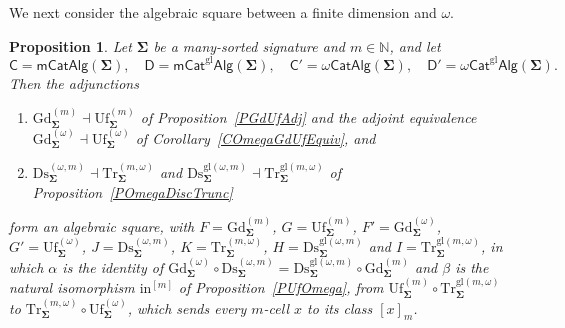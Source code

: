 \documentclass[a4paper, reqno
]{amsart}
\newcommand{\sig}[1]{\mathbf{#1}}             %
\newcommand{\gl}{\mathrm{gl}}                %
\newcommand{\Gd}{\mathrm{Gd}}
\newcommand{\Uf}{\mathrm{Uf}}
\newcommand{\Ds}{\mathrm{Ds}}
\newcommand{\Tr}{\mathrm{Tr}}
\theoremstyle{plain}
\newtheorem{proposition}[theorem]{Proposition}
\theoremstyle{definition}
\begin{document}
We next consider the algebraic square between a finite dimension and $\omega$.

\begin{proposition}\label{PAlgSquareOmega}
Let $\sig{\Sigma}$ be a many-sorted signature and $m\in\mathbb{N}$, and let
$$
\mathsf{C}=\mathsf{mCatAlg}(\sig{\Sigma}),\quad
\mathsf{D}=\mathsf{mCat}^{\gl}\mathsf{Alg}(\sig{\Sigma}),\quad
\mathsf{C}'=\omega\mathsf{CatAlg}(\sig{\Sigma}),\quad
\mathsf{D}'=\omega\mathsf{Cat}^{\gl}\mathsf{Alg}(\sig{\Sigma}).
$$
Then the adjunctions
\begin{enumerate}
\item $\Gd^{(m)}_{\sig{\Sigma}}\dashv\Uf^{(m)}_{\sig{\Sigma}}$ of Proposition~\ref{PGdUfAdj} and the adjoint equivalence $\Gd^{(\omega)}_{\sig{\Sigma}}\dashv\Uf^{(\omega)}_{\sig{\Sigma}}$ of Corollary~\ref{COmegaGdUfEquiv}, and
\item $\Ds^{(\omega,m)}_{\sig{\Sigma}}\dashv \Tr^{(m,\omega)}_{\sig{\Sigma}}$ and $\Ds^{\gl(\omega,m)}_{\sig{\Sigma}}\dashv \Tr^{\gl(m,\omega)}_{\sig{\Sigma}}$ of Proposition~\ref{POmegaDiscTrunc}
\end{enumerate}
form an algebraic square, with $F=\Gd^{(m)}_{\sig{\Sigma}}$, $G=\Uf^{(m)}_{\sig{\Sigma}}$, $F'=\Gd^{(\omega)}_{\sig{\Sigma}}$, $G'=\Uf^{(\omega)}_{\sig{\Sigma}}$, $J=\Ds^{(\omega,m)}_{\sig{\Sigma}}$, $K=\Tr^{(m,\omega)}_{\sig{\Sigma}}$, $H=\Ds^{\gl(\omega,m)}_{\sig{\Sigma}}$ and $I=\Tr^{\gl(m,\omega)}_{\sig{\Sigma}}$, in which $\alpha$ is the identity of $\Gd^{(\omega)}_{\sig{\Sigma}}\circ\Ds^{(\omega,m)}_{\sig{\Sigma}}=\Ds^{\gl(\omega,m)}_{\sig{\Sigma}}\circ\Gd^{(m)}_{\sig{\Sigma}}$ and $\beta$ is the natural isomorphism $\mathrm{in}^{[m]}$ of Proposition~\ref{PUfOmega}, from $\Uf^{(m)}_{\sig{\Sigma}}\circ \Tr^{\gl(m,\omega)}_{\sig{\Sigma}}$ to $\Tr^{(m,\omega)}_{\sig{\Sigma}}\circ\Uf^{(\omega)}_{\sig{\Sigma}}$, which sends every $m$-cell $x$ to its class $[x]_{m}$.
\end{proposition}
\end{document}

